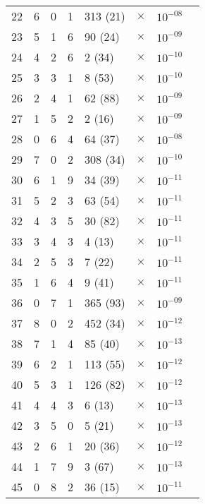 \begin{table}[htbp]
\begin{center}
\begin{tabular}{rrrr@{.}lccl}
22 & 6 & 0 & 1 & 313 (21) & $ \times $ & $ 10^{-08} $ \\
23 & 5 & 1 & 6 & 90 (24) & $ \times $ & $ 10^{-09} $ \\
24 & 4 & 2 & 6 & 2 (34) & $ \times $ & $ 10^{-10} $ \\
25 & 3 & 3 & 1 & 8 (53) & $ \times $ & $ 10^{-10} $ \\
26 & 2 & 4 & 1 & 62 (88) & $ \times $ & $ 10^{-09} $ \\
27 & 1 & 5 & 2 & 2 (16) & $ \times $ & $ 10^{-09} $ \\
28 & 0 & 6 & 4 & 64 (37) & $ \times $ & $ 10^{-08} $ \\[5pt]
29 & 7 & 0 & 2 & 308 (34) & $ \times $ & $ 10^{-10} $ \\
30 & 6 & 1 & 9 & 34 (39) & $ \times $ & $ 10^{-11} $ \\
31 & 5 & 2 & 3 & 63 (54) & $ \times $ & $ 10^{-11} $ \\
32 & 4 & 3 & 5 & 30 (82) & $ \times $ & $ 10^{-11} $ \\
33 & 3 & 4 & 3 & 4 (13) & $ \times $ & $ 10^{-11} $ \\
34 & 2 & 5 & 3 & 7 (22) & $ \times $ & $ 10^{-11} $ \\
35 & 1 & 6 & 4 & 9 (41) & $ \times $ & $ 10^{-11} $ \\
36 & 0 & 7 & 1 & 365 (93) & $ \times $ & $ 10^{-09} $ \\[5pt]
37 & 8 & 0 & 2 & 452 (34) & $ \times $ & $ 10^{-12} $ \\
38 & 7 & 1 & 4 & 85 (40) & $ \times $ & $ 10^{-13} $ \\
39 & 6 & 2 & 1 & 113 (55) & $ \times $ & $ 10^{-12} $ \\
40 & 5 & 3 & 1 & 126 (82) & $ \times $ & $ 10^{-12} $ \\
41 & 4 & 4 & 3 & 6 (13) & $ \times $ & $ 10^{-13} $ \\
42 & 3 & 5 & 0 & 5 (21) & $ \times $ & $ 10^{-13} $ \\
43 & 2 & 6 & 1 & 20 (36) & $ \times $ & $ 10^{-12} $ \\
44 & 1 & 7 & 9 & 3 (67) & $ \times $ & $ 10^{-13} $ \\
45 & 0 & 8 & 2 & 36 (15) & $ \times $ & $ 10^{-11} $ \\[5pt]
\end{tabular}
\end{center}
\label{tab:coeffs emis HeB I}
\end{table}

